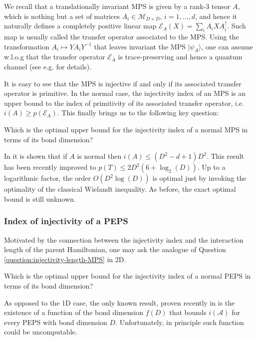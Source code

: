 \documentclass[smallextended]{svjour3}
\renewcommand{\1}{\mathbbm{1}}
\newcommand{\ket} [1] {\vert #1 \rangle}
\begin{document}
We recall that a translationally invariant MPS is given by a rank-3 tensor $A$, which is nothing but a set of matrices $A_i\in \mathcal{M}_{D\times D}$, $i=1,\ldots, d$, and hence it naturally defines a completely positive linear map $\mathcal{E}_{{A}}(X)= \sum_i A_i XA_i^\dagger$. Such map is usually called the transfer operator associated to the MPS. Using the transformation $A_i\mapsto YA_iY^{-1}$ that leaves invariant the MPS $\ket{\psi_A}$, one can assume w.l.o.g that the transfer operator $\mathcal{E}_{A}$ is trace-preserving and hence a quantum channel (see e.g. \cite{MPDO} for details).

It is easy to see \cite{qWielandt} that the MPS is injective if and only if its associated transfer operator is primitive. In the normal case, the injectivity index of an MPS is an upper bound to the index of primitivity of its associated transfer operator, i.e. $i(A)\ge p(\mathcal{E}_{A})$. This finally brings us to the following key question:

\begin{question} \label{question:injectivity-length-MPS}
    Which is the optimal upper bound for the injectivity index of a normal MPS in terms of its bond dimension?
\end{question}

In \cite{qWielandt} it is shown that if $A$ is normal then $i({A})\le (D^2-d+1)D^2$. This result has been recently improved \cite{Michalek} to $p(T)\le 2D^2(6+\log_2(D))$. Up to a   logarithmic factor, the order $O(D^2\log(D))$ is optimal just by invoking the optimality of the classical Wielandt inequality. As before, the exact optimal bound is still unknown.\\

\subsubsection{Index of injectivity of a PEPS}

Motivated by the connection between the injectivity index and the interaction length of the parent Hamiltonian, one may ask the analogue of Question \ref{question:injectivity-length-MPS} in 2D.

\begin{question} \label{question:injectivity-PEPS1}
    Which is the optimal upper bound for the injectivity index of a normal  PEPS in terms of its bond dimension?
\end{question}

As opposed to the 1D case, the only known result, proven recently in \cite{Michalek-2D} is the existence of a function of the bond dimension $f(D)$ that bounds $i(\mathcal{A})$ for every PEPS with bond dimension $D$. Unfortunately, in principle such function could be uncomputable.
\end{document}
